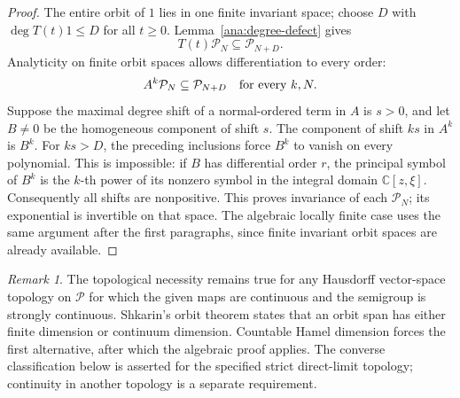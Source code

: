 \documentclass[reqno]{amsart}
\theoremstyle{definition}
\theoremstyle{remark}
\newtheorem{remark}[theorem]{Remark}
\newcommand{\C}{\mathbb C}
\begin{document}
\begin{proof}
The entire orbit of \(1\) lies in one finite invariant space; choose
\(D\) with \(\deg T(t)1\le D\) for all \(t\ge0\).
Lemma~\ref{ana:degree-defect} gives
\[
 T(t)\mathcal P_N\subseteq\mathcal P_{N+D}.
\]
Analyticity on finite orbit spaces allows differentiation to every order:
\[
 A^k\mathcal P_N\subseteq\mathcal P_{N+D}
 \quad\hbox{for every }k,N.
\]
Suppose the maximal degree shift of a normal-ordered term in \(A\)
is \(s>0\), and let \(B\ne0\) be the homogeneous component of shift \(s\).
The component of shift \(ks\) in \(A^k\) is \(B^k\).
For \(ks>D\), the preceding inclusions force \(B^k\) to vanish on
every polynomial.  This is impossible: if \(B\) has differential order
\(r\), the principal symbol of \(B^k\) is the \(k\)-th power of its
nonzero symbol in the integral domain \(\C[z,\xi]\).
Consequently all shifts are nonpositive.  This proves invariance of
each \(\mathcal P_N\); its exponential is invertible on that space.
The algebraic locally finite case uses the same argument after the first
paragraphs, since finite invariant orbit spaces are already available.
\end{proof}

\begin{remark}
The topological necessity remains true for any Hausdorff vector-space
topology on \(\mathcal P\) for which the given maps are continuous and the
semigroup is strongly continuous.  Shkarin's orbit theorem
\cite[preprint Lemma 5.4]{Shkarin11} states that an orbit span has either finite
dimension or continuum dimension.  Countable Hamel dimension forces the
first alternative, after which the algebraic proof applies.  The converse
classification below is asserted for the specified strict direct-limit
topology; continuity in another topology is a separate requirement.
\end{remark}
\end{document}
